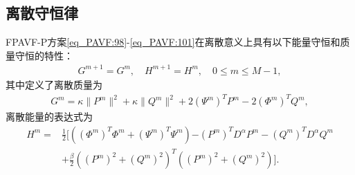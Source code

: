 \subsection{离散守恒律}
\begin{theorem}\label{thm_PAVF:4}
FPAVF-P方案\eqref{eq_PAVF:98}-\eqref{eq_PAVF:101}在离散意义上具有以下能量守恒和质量守恒的特性：
\begin{align}\label{eq_PAVF:11141}
G^{m+1}=G^{m}, \quad H^{m+1}=H^{m}, \quad 0 \leq m \leq M-1,
\end{align}
其中定义了离散质量为
\begin{align}\label{eq_PAVF:11142}
G^{m}=\kappa\|P^{m}\|^2+\kappa\|Q^{m}\|^2+2 \left(\Psi^{m}\right)^T P^{m}-2 \left(\varPhi^{m}\right)^T Q^{m},
\end{align}
离散能量的表达式为
\begin{align}
H^{m}=&\frac{1}{2}[((\varPhi^{m})^{T}\varPhi^{m}+(\Psi^{m})^{T}\Psi^{m}){-(P^{m})^{T} D^{\alpha} P^{m}-(Q^{m})^{T} D^{\alpha} Q^{m}}\nonumber\\
&+\frac{\beta}{2}((P^{m})^2+(Q^{m})^2)^{T}((P^{m})^2+(Q^{m})^2)].\label{eq_PAVF:800}
\end{align}
\end{theorem}

